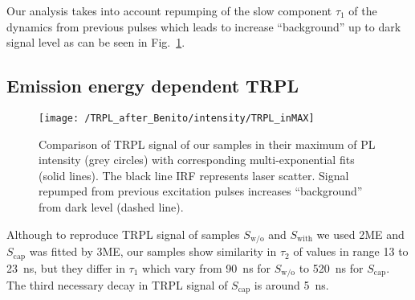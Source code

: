 Our analysis takes into account repumping of the slow component $\tau_1$ of the dynamics from previous pulses which leads to increase \enquote{background} up to dark signal level as can be seen in Fig.~\ref{fig:TRPL_int_all_max}.


\subsection{Emission energy dependent TRPL}
%


\begin{figure}[!ht]
	\centering
	\texttt{[image: /TRPL\_after\_Benito/intensity/TRPL\_inMAX]}
	\caption{Comparison of TRPL signal of our samples in their maximum of PL intensity (grey circles) with corresponding multi-exponential fits (solid lines). The black line IRF represents laser scatter. Signal repumped from previous excitation pulses increases \enquote{background} from dark level (dashed line).}
	\label{fig:TRPL_int_all_max}
\end{figure}

%
%

%
Although to reproduce TRPL signal of samples $S_\mathrm{w/o}$ and $S_\mathrm{with}$ we used 2ME and $S_\mathrm{cap}$ was fitted by 3ME, our samples show similarity in $\tau_2$ of values in range 13 to 23~ns, but they differ in $\tau_1$ which vary from 90~ns for $S_\mathrm{w/o}$ to 520~ns for $S_\mathrm{cap}$. The third necessary decay in TRPL signal of $S_\mathrm{cap}$ is around 5~ns.

